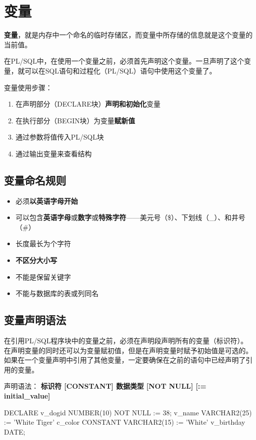 \documentclass[11pt, a4paper, oneside, UTF8]{ctexbook}
\let\kaishu\relax %
\begin{document}
\chapter{变量}
 {\bfseries\kaishu 变量}，就是内存中一个命名的临时存储区，而变量中所存储的信息就是这个变量的当前值。

在PL/SQL中，在使用一个变量之前，必须首先声明这个变量。一旦声明了这个变量，就可以在SQL语句和过程化（PL/SQL）语句中使用这个变量了。

变量使用步骤：
\begin{enumerate}
  \item 在声明部分（DECLARE块）\textbf{声明和初始化}变量
  \item 在执行部分（BEGIN块）为变量\textbf{赋新值}
  \item 通过参数将值传入PL/SQL块
  \item 通过输出变量来查看结构
\end{enumerate}
\section{变量命名规则}
\begin{itemize}
  \item 必须{\bfseries\kaishu 以英语字母开始}
  \item 可以包含{\bfseries\kaishu 英语字母}或{\bfseries\kaishu 数字}或{\bfseries\kaishu 特殊字符}——美元号（\$）、下划线（\_）、和井号（\#）
  \item 长度最长为{\bfseries\kaishu 30}个字符
  \item {\bfseries\kaishu 不区分大小写}
  \item 不能是保留关键字
  \item 不能与数据库的表或列同名
\end{itemize}
\section{变量声明语法}
在引用PL/SQL程序块中的变量之前，必须在声明段声明所有的变量（标识符）。
在声明变量的同时还可以为变量赋初值，但是在声明变量时赋予初始值是可选的。
如果在一个变量声明中引用了其他变量，一定要确保在之前的语句中已经声明了引用的变量。

声明语法：
{\bfseries\kaishu 标识符 [CONSTANT] 数据类型 [NOT NULL] [:= initial\_value]}

\begin{plsql}[caption=PL/SQL变量声明语法示例]
  DECLARE
  v_dogid NUMBER(10) NOT NULL := 38;
  v_name VARCHAR2(25) := 'White Tiger'
  c_color CONSTANT VARCHAR2(15) := 'White'
  v_birthday DATE;
\end{plsql}
\end{document}
